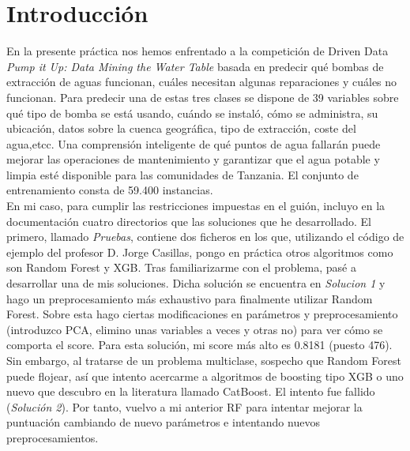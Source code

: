 \newpage
	
\tableofcontents %
	
\listoffigures

	
\newpage




\section{Introducción}

En la presente práctica nos hemos enfrentado a la competición de Driven Data \textit{Pump it Up: Data Mining the Water Table} basada en predecir qué bombas de extracción de aguas funcionan, cuáles necesitan algunas reparaciones y cuáles no funcionan. Para predecir una de estas tres clases se dispone de 39 variables sobre qué tipo de bomba se está usando, cuándo se instaló, cómo se administra, su ubicación, datos sobre la cuenca geográfica, tipo de extracción, coste del agua,etcc. Una comprensión inteligente de qué puntos de agua fallarán puede mejorar las operaciones de mantenimiento y garantizar que el agua potable y limpia esté disponible para las comunidades de Tanzania. El conjunto de entrenamiento consta de 59.400 instancias. \\

En mi caso, para cumplir las restricciones impuestas en el guión, incluyo en la documentación cuatro directorios que las soluciones que he desarrollado. El primero, llamado \textit{Pruebas}, contiene dos ficheros en los que, utilizando el código de ejemplo del profesor D. Jorge Casillas, pongo en práctica otros algoritmos como son Random Forest y XGB. Tras familiarizarme con el problema, pasé a desarrollar una de mis soluciones. Dicha solución se encuentra en \textit{Solucion 1} y hago un preprocesamiento más exhaustivo para finalmente utilizar Random Forest. Sobre esta hago ciertas modificaciones en parámetros y preprocesamiento (introduzco PCA, elimino unas variables a veces y otras no) para ver cómo se comporta el score. Para esta solución, mi score más alto es 0.8181 (puesto 476). \\

Sin embargo, al tratarse de un problema multiclase, sospecho que Random Forest puede flojear, así que intento acercarme a algoritmos de boosting tipo XGB o uno nuevo que descubro en la literatura llamado CatBoost. El intento fue fallido (\textit{Solución 2}). Por tanto, vuelvo a mi anterior RF para intentar mejorar la puntuación cambiando de nuevo parámetros e intentando nuevos preprocesamientos. \\

